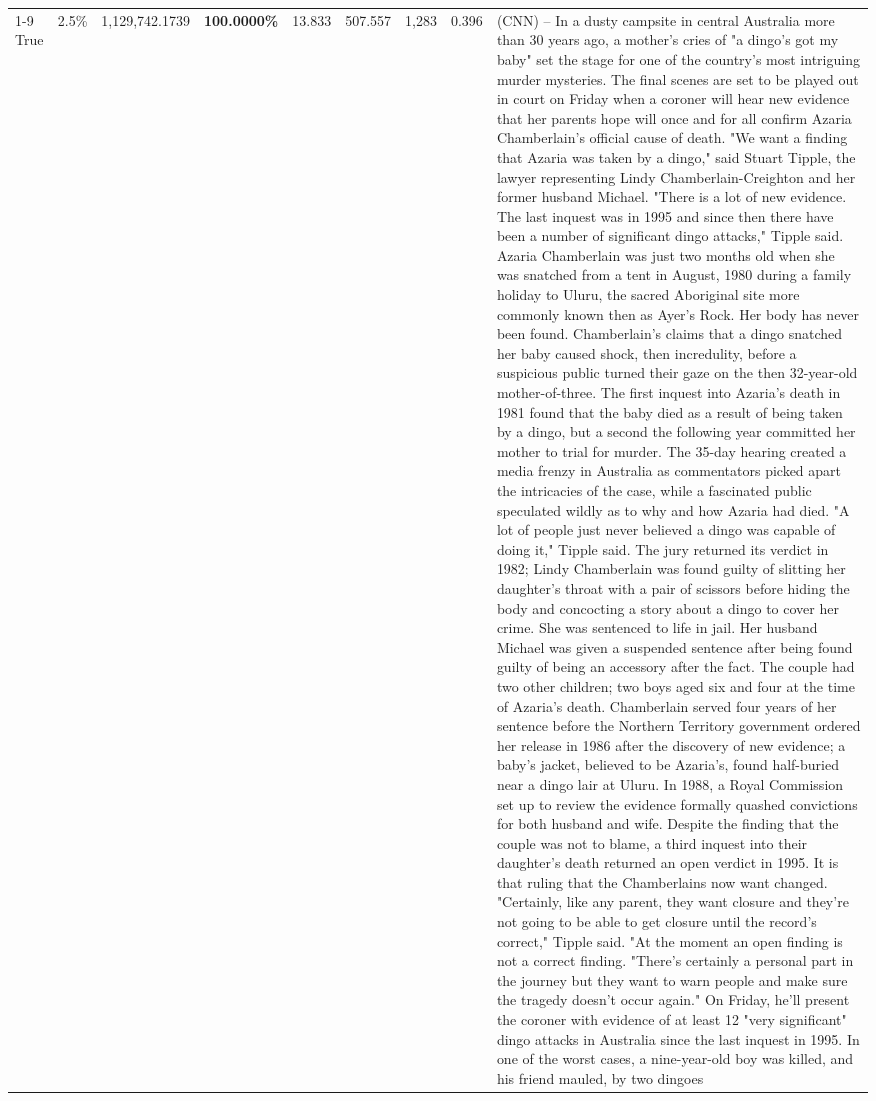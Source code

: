 \begin{table}[H]
\begin{tabular}{lllrlllll}
 \\
\cline{1-9}
True & 2.5\% & 1,129,742.1739 & \bfseries \color{red} 100.0000\% & 13.833 & 507.557 & 1,283 & 0.396 & (CNN) -- In a dusty campsite in central Australia more than 30 years ago, a mother's cries of "a dingo's got my baby" set the stage for one of the country's most intriguing murder mysteries. The final scenes are set to be played out in court on Friday when a coroner will hear new evidence that her parents hope will once and for all confirm Azaria Chamberlain's official cause of death. "We want a finding that Azaria was taken by a dingo," said Stuart Tipple, the lawyer representing Lindy Chamberlain-Creighton and her former husband Michael. "There is a lot of new evidence. The last inquest was in 1995 and since then there have been a number of significant dingo attacks," Tipple said. Azaria Chamberlain was just two months old when she was snatched from a tent in August, 1980 during a family holiday to Uluru, the sacred Aboriginal site more commonly known then as Ayer's Rock. Her body has never been found. Chamberlain's claims that a dingo snatched her baby caused shock, then incredulity, before a suspicious public turned their gaze on the then 32-year-old mother-of-three. The first inquest into Azaria's death in 1981 found that the baby died as a result of being taken by a dingo, but a second the following year committed her mother to trial for murder. The 35-day hearing created a media frenzy in Australia as commentators picked apart the intricacies of the case, while a fascinated public speculated wildly as to why and how Azaria had died. "A lot of people just never believed a dingo was capable of doing it," Tipple said. The jury returned its verdict in 1982; Lindy Chamberlain was found guilty of slitting her daughter's throat with a pair of scissors before hiding the body and concocting a story about a dingo to cover her crime. She was sentenced to life in jail. Her husband Michael was given a suspended sentence after being found guilty of being an accessory after the fact. The couple had two other children; two boys aged six and four at the time of Azaria's death. Chamberlain served four years of her sentence before the Northern Territory government ordered her release in 1986 after the discovery of new evidence; a baby's jacket, believed to be Azaria's, found half-buried near a dingo lair at Uluru. In 1988, a Royal Commission set up to review the evidence formally quashed convictions for both husband and wife. Despite the finding that the couple was not to blame, a third inquest into their daughter's death returned an open verdict in 1995. It is that ruling that the Chamberlains now want changed. "Certainly, like any parent, they want closure and they're not going to be able to get closure until the record's correct," Tipple said. "At the moment an open finding is not a correct finding. "There's certainly a personal part in the journey but they want to warn people and make sure the tragedy doesn't occur again." On Friday, he'll present the coroner with evidence of at least 12 "very significant" dingo attacks in Australia since the last inquest in 1995. In one of the worst cases, a nine-year-old boy was killed, and his friend mauled, by two dingoes 
\end{tabular}
\end{table}
